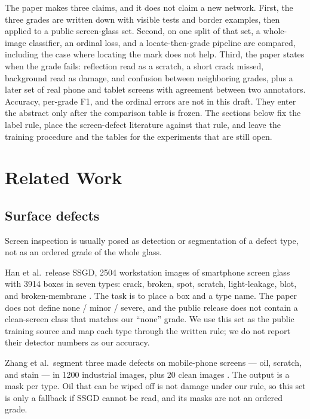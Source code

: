 \documentclass[10pt]{article}
\begin{document}
The paper makes three claims, and it does not claim a new network. First, the three grades are written down with visible tests and border examples, then applied to a public screen-glass set. Second, on one split of that set, a whole-image classifier, an ordinal loss, and a locate-then-grade pipeline are compared, including the case where locating the mark does not help. Third, the paper states when the grade fails: reflection read as a scratch, a short crack missed, background read as damage, and confusion between neighboring grades, plus a later set of real phone and tablet screens with agreement between two annotators. Accuracy, per-grade F1, and the ordinal errors are not in this draft. They enter the abstract only after the comparison table is frozen. The sections below fix the label rule, place the screen-defect literature against that rule, and leave the training procedure and the tables for the experiments that are still open.


\section{Related Work}
\subsection{Surface defects}
Screen inspection is usually posed as detection or segmentation of a defect type, not as an ordered grade of the whole glass.

Han et al.\ release SSGD, 2504 workstation images of smartphone screen glass with 3914 boxes in seven types: crack, broken, spot, scratch, light-leakage, blot, and broken-membrane \cite{han2023ssgd}. The task is to place a box and a type name. The paper does not define none / minor / severe, and the public release does not contain a clean-screen class that matches our ``none'' grade. We use this set as the public training source and map each type through the written rule; we do not report their detector numbers as our accuracy.

Zhang et al.\ segment three made defects on mobile-phone screens --- oil, scratch, and stain --- in 1200 industrial images, plus 20 clean images \cite{zhang2022fdsnet}. The output is a mask per type. Oil that can be wiped off is not damage under our rule, so this set is only a fallback if SSGD cannot be read, and its masks are not an ordered grade.
\end{document}
